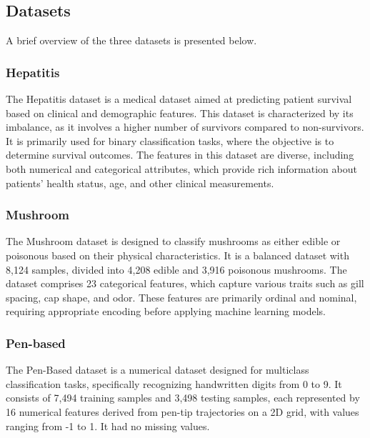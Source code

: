 \subsection{Datasets}
A brief overview of the three datasets is presented below.

\subsubsection{Hepatitis}
The Hepatitis dataset is a medical dataset aimed at predicting patient survival based on clinical and demographic features. 
This dataset is characterized by its imbalance, as it involves a higher number of survivors compared to non-survivors. It 
is primarily used for binary classification tasks, where the objective is to determine survival outcomes. The features in 
this dataset are diverse, including both numerical and categorical attributes, which provide rich information about patients'
 health status, age, and other clinical measurements. 


\subsubsection{Mushroom}

The Mushroom dataset is designed to classify mushrooms as either edible or poisonous based on their physical 
characteristics. It is a balanced dataset with 8,124 samples, divided into 4,208 edible and 3,916 poisonous mushrooms. 
The dataset comprises 23 categorical features, which capture various traits such as gill spacing, cap shape, and odor. 
These features are primarily ordinal and nominal, requiring appropriate encoding before applying machine learning models. 

\subsubsection{Pen-based}

The Pen-Based dataset is a numerical dataset designed for multiclass classification tasks, specifically recognizing handwritten 
digits from 0 to 9. It consists of 7,494 training samples and 3,498 testing samples, each represented by 16 numerical features 
derived from pen-tip trajectories on a 2D grid, with values ranging from -1 to 1. It had no missing values.
